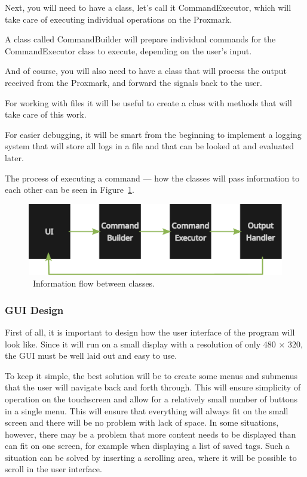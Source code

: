 Next, you will need to have a class, let's call it CommandExecutor, which will take care of executing individual operations on the Proxmark.

A class called CommandBuilder will prepare individual commands for the CommandExecutor class to execute, depending on the user's input.

And of course, you will also need to have a class that will process the output received from the Proxmark, and forward the signals back to the user.

For working with files it will be useful to create a class with methods that will take care of this work. 

For easier debugging, it will be smart from the beginning to implement a logging system that will store all logs in a file and that can be looked at and evaluated later.

The process of executing a command --- how the classes will pass information to each other can be seen in Figure~\ref{fig:architecture}.

\begin{figure}[ht]
  \centering
  \includegraphics[width=\textwidth]{text/architecture.pdf}
  \caption{~Information flow between classes.}
  \label{fig:architecture}
\end{figure}


\subsubsection{GUI Design}

First of all, it is important to design how the user interface of the program will look like. Since it will run on a small display with a resolution of only 480 × 320, the GUI must be well laid out and easy to use.

To keep it simple, the best solution will be to create some menus and submenus that the user will navigate back and forth through. This will ensure simplicity of operation on the touchscreen and allow for a relatively small number of buttons in a single menu. This will ensure that everything will always fit on the small screen and there will be no problem with lack of space. In some situations, however, there may be a problem that more content needs to be displayed than can fit on one screen, for example when displaying a list of saved tags. Such a situation can be solved by inserting a scrolling area, where it will be possible to scroll in the user interface.

